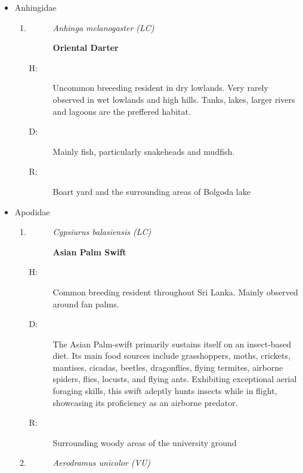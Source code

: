 \begin{itemize}
\begin{enumerate}
\begin{description}
\end{description}%
\end{enumerate}%
\item%
Anhingidae%
\begin{enumerate}%
\item%
\begin{description}%
\item[]%
\textit{Anhinga melanogaster (LC)}%
\item[]%
\textbf{Oriental Darter}%
\end{description}%
\begin{description}%
\item[H: ]%
Uncommon breeeding resident in dry lowlands. Very rarely observed in wet lowlands and high hills. Tanks, lakes, larger rivers and lagoons are the preffered habitat.%
\item[D: ]%
Mainly fish, particularly snakeheads and mudfish.%
\item[R: ]%
Boart yard and the surrounding areas of Bolgoda lake%
\end{description}%
\end{enumerate}%
\item%
Apodidae%
\begin{enumerate}%
\item%
\begin{description}%
\item[]%
\textit{Cypsiurus balasiensis (LC)}%
\item[]%
\textbf{Asian Palm Swift}%
\end{description}%
\begin{description}%
\item[H: ]%
Common breeding resident throughout Sri Lanka. Mainly observed around fan palms.%
\item[D: ]%
The Asian Palm{-}swift primarily sustains itself on an insect{-}based diet. Its main food sources include grasshoppers, moths, crickets, mantises, cicadas, beetles, dragonflies, flying termites, airborne spiders, flies, locusts, and flying ants. Exhibiting exceptional aerial foraging skills, this swift adeptly hunts insects while in flight, showcasing its proficiency as an airborne predator.%
\item[R: ]%
Surrounding woody areas of the university ground%
\end{description}%
\item%
\begin{description}%
\item[]%
\textit{Aerodramus unicolor (VU)}%

\end{description}
\end{enumerate}
\end{itemize}
